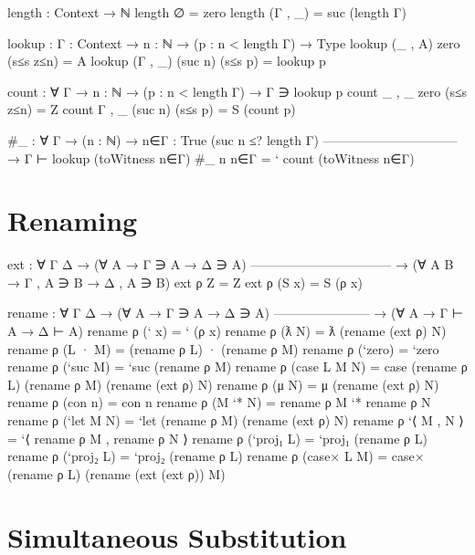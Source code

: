 \begin{fence}
\begin{code}
length : Context → ℕ
length ∅        =  zero
length (Γ , _)  =  suc (length Γ)

lookup : {Γ : Context} → {n : ℕ} → (p : n < length Γ) → Type
lookup {(_ , A)} {zero}    (s≤s z≤n)  =  A
lookup {(Γ , _)} {(suc n)} (s≤s p)    =  lookup p

count : ∀ {Γ} → {n : ℕ} → (p : n < length Γ) → Γ ∋ lookup p
count {_ , _} {zero}    (s≤s z≤n)  =  Z
count {Γ , _} {(suc n)} (s≤s p)    =  S (count p)

#_ : ∀ {Γ}
  → (n : ℕ)
  → {n∈Γ : True (suc n ≤? length Γ)}
    --------------------------------
  → Γ ⊢ lookup (toWitness n∈Γ)
#_ n {n∈Γ}  =  ` count (toWitness n∈Γ)
\end{code}
\end{fence}

\hypertarget{renaming}{%
\section{Renaming}\label{renaming}}

\begin{fence}
\begin{code}
ext : ∀ {Γ Δ}
  → (∀ {A}   →     Γ ∋ A →     Δ ∋ A)
    ---------------------------------
  → (∀ {A B} → Γ , A ∋ B → Δ , A ∋ B)
ext ρ Z      =  Z
ext ρ (S x)  =  S (ρ x)

rename : ∀ {Γ Δ}
  → (∀ {A} → Γ ∋ A → Δ ∋ A)
    -----------------------
  → (∀ {A} → Γ ⊢ A → Δ ⊢ A)
rename ρ (` x)          =  ` (ρ x)
rename ρ (ƛ N)          =  ƛ (rename (ext ρ) N)
rename ρ (L · M)        =  (rename ρ L) · (rename ρ M)
rename ρ (`zero)        =  `zero
rename ρ (`suc M)       =  `suc (rename ρ M)
rename ρ (case L M N)   =  case (rename ρ L) (rename ρ M) (rename (ext ρ) N)
rename ρ (μ N)          =  μ (rename (ext ρ) N)
rename ρ (con n)        =  con n
rename ρ (M `* N)       =  rename ρ M `* rename ρ N
rename ρ (`let M N)     =  `let (rename ρ M) (rename (ext ρ) N)
rename ρ `⟨ M , N ⟩     =  `⟨ rename ρ M , rename ρ N ⟩
rename ρ (`proj₁ L)     =  `proj₁ (rename ρ L)
rename ρ (`proj₂ L)     =  `proj₂ (rename ρ L)
rename ρ (case× L M)    =  case× (rename ρ L) (rename (ext (ext ρ)) M)
\end{code}
\end{fence}

\hypertarget{simultaneous-substitution}{%
\section{Simultaneous Substitution}\label{simultaneous-substitution}}

